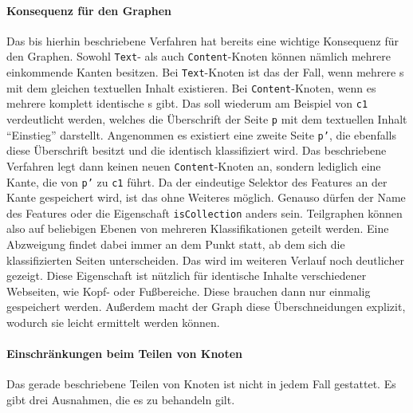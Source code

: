     \paragraph*{Konsequenz für den Graphen}
    Das bis hierhin beschriebene Verfahren hat bereits eine wichtige
    Konsequenz für den Graphen.
    Sowohl \texttt{Text}- als auch \texttt{Content}-Knoten können nämlich mehrere einkommende Kanten besitzen.
    Bei \texttt{Text}-Knoten ist das der Fall, wenn mehrere {\contentFeature}s mit dem gleichen textuellen Inhalt existieren.
    Bei \texttt{Content}-Knoten, wenn es mehrere komplett identische {\contentFeature}s gibt.
    Das soll wiederum am Beispiel von \texttt{c1} verdeutlicht werden,
    welches die Überschrift der Seite \texttt{p} mit dem textuellen Inhalt "`Einstieg"' darstellt.
    Angenommen es existiert eine zweite Seite \texttt{p'},
    die ebenfalls diese Überschrift besitzt und die identisch klassifiziert wird.
    Das beschriebene Verfahren legt dann keinen neuen \texttt{Content}-Knoten an,
    sondern lediglich eine Kante, die von \texttt{p'} zu \texttt{c1} führt.
    Da der eindeutige Selektor des Features an der Kante gespeichert wird, ist das ohne Weiteres möglich.
    Genauso dürfen der Name des Features oder die Eigenschaft \texttt{isCollection} anders sein.
    Teilgraphen können also auf beliebigen Ebenen von mehreren Klassifikationen geteilt werden.
    Eine Abzweigung findet dabei immer an dem Punkt statt,
    ab dem sich die klassifizierten Seiten unterscheiden.
    Das wird im weiteren Verlauf noch deutlicher gezeigt.    
    Diese Eigenschaft ist nützlich für identische Inhalte
    verschiedener Webseiten, wie Kopf- oder Fußbereiche.
    Diese brauchen dann nur einmalig gespeichert werden.
    Außerdem macht der Graph diese Überschneidungen explizit, wodurch sie leicht
    ermittelt werden können.

    \paragraph*{Einschränkungen beim Teilen von Knoten}
    Das gerade beschriebene Teilen von Knoten ist nicht in jedem Fall gestattet.
    Es gibt drei Ausnahmen, die es zu behandeln gilt.

